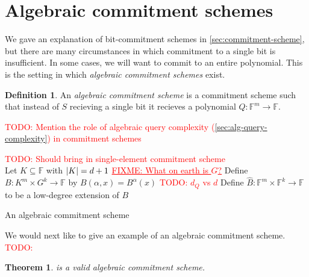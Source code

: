 \documentclass[english,12pt]{reedthesis}
\theoremstyle{plain}
\newtheorem{thm}{Theorem}[section]
\theoremstyle{definition}
\newtheorem{defn}[defn]{Definition}
\theoremstyle{remark}
\DeclarePairedDelimiter{\abs}{\lvert}{\rvert}
\newcommand{\TODO}[1]{\textcolor{red}{TODO: #1}}
\newcommand{\FIXME}[1]{\textcolor{red}{\underline{FIXME: #1}}}
\begin{document}

\section{Algebraic commitment schemes}\label{sec:alg-commit-scheme}

We gave an explanation of bit-commitment schemes in
\cref{sec:commitment-scheme}, but there are many circumstances in which
commitment to a single bit is insufficient. In some cases, we will want to
commit to an entire polynomial. This is the setting in which \emph{algebraic
  commitment schemes} exist.

\begin{defn}\label{def:alg-comm-scheme}
  An \emph{algebraic commitment scheme} is a commitment scheme such that instead
  of $S$ recieving a single bit it recieves a polynomial
  $Q: \mathbb{F}^{m} \rightarrow \mathbb{F}$.
\end{defn}

\TODO{Mention the role of algebraic query complexity
  (\cref{sec:alg-query-complexity}) in commitment schemes}

\begin{algorithm}[htbp]
  \TODO{Should bring in single-element commitment scheme} \\
  Let $K \subseteq \mathbb{F}$ with $\abs{K} = d + 1$\;
  \FIXME{What on earth is $G$?}
  Define $B: K^{m} \times G^{k} \rightarrow \mathbb{F}$ by $B(\alpha, x) = B^{\alpha}(x)$\;
  \TODO{$d_{Q}$ vs $d$}
  Define $\hat{B}: \mathbb{F}^{m} \times \mathbb{F}^{k} \rightarrow \mathbb{F}$ to be a
  low-degree extension of
  $B$
  \;
  \caption{An algebraic commitment scheme~\cite[]{CFGS22}}\label{alg:alg-commit-scheme}
\end{algorithm}

We would next like to give an example of an algebraic commitment scheme. \TODO{}

\begin{thm}\label{thm:alg-commit-scheme}
   is a valid algebraic commitment scheme.
\end{thm}
\end{document}
